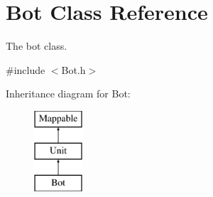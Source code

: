 \hypertarget{classBot}{
\section{Bot Class Reference}
\label{classBot}
}


The bot class.  




{\ttfamily \#include $<$Bot.h$>$}

Inheritance diagram for Bot:\begin{figure}[H]
\begin{center}
\leavevmode
\includegraphics[height=3cm]{classBot}
\end{center}
\end{figure}
